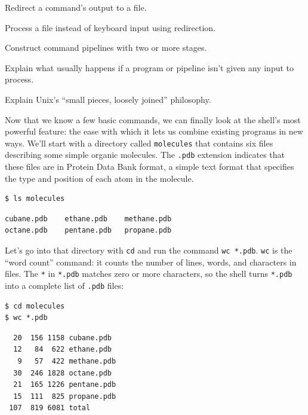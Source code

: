 \documentclass{book}
\begin{document}
\begin{swcitemize}
\item
  Redirect a command's output to a file.
\item
  Process a file instead of keyboard input using redirection.
\item
  Construct command pipelines with two or more stages.
\item
  Explain what usually happens if a program or pipeline isn't given any
  input to process.
\item
  Explain Unix's ``small pieces, loosely joined'' philosophy.
\end{swcitemize}

Now that we know a few basic commands, we can finally look at the
shell's most powerful feature: the ease with which it lets us combine
existing programs in new ways. We'll start with a directory called
\texttt{molecules} that contains six files describing some simple
organic molecules. The \texttt{.pdb} extension indicates that these
files are in Protein Data Bank format, a simple text format that
specifies the type and position of each atom in the molecule.

\begin{verbatim}
$ ls molecules
\end{verbatim}

\begin{verbatim}
cubane.pdb    ethane.pdb    methane.pdb
octane.pdb    pentane.pdb   propane.pdb
\end{verbatim}

Let's go into that directory with \texttt{cd} and run the command
\texttt{wc *.pdb}. \texttt{wc} is the ``word count'' command: it counts
the number of lines, words, and characters in files. The \texttt{*} in
\texttt{*.pdb} matches zero or more characters, so the shell turns
\texttt{*.pdb} into a complete list of \texttt{.pdb} files:

\begin{verbatim}
$ cd molecules
$ wc *.pdb
\end{verbatim}

\begin{verbatim}
  20  156 1158 cubane.pdb
  12   84  622 ethane.pdb
   9   57  422 methane.pdb
  30  246 1828 octane.pdb
  21  165 1226 pentane.pdb
  15  111  825 propane.pdb
 107  819 6081 total
\end{verbatim}
\end{document}
